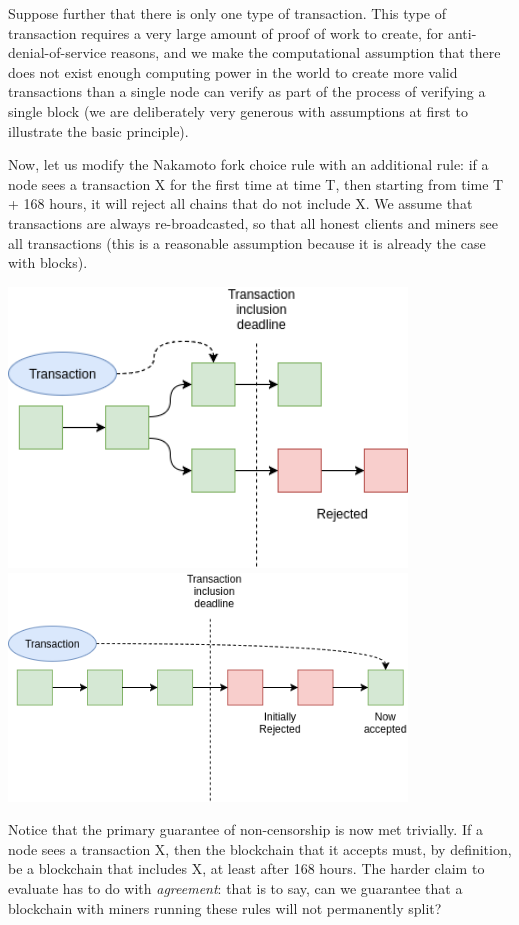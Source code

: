 \documentclass[12pt]{article}
\begin{document}
Suppose further that there is only one type of transaction. This type of transaction requires a very large amount of proof of work to create, for anti-denial-of-service reasons, and we make the computational assumption that there does not exist enough computing power in the world to create more valid transactions than a single node can verify as part of the process of verifying a single block (we are deliberately very generous with assumptions at first to illustrate the basic principle).

Now, let us modify the Nakamoto fork choice rule with an additional rule: if a node sees a transaction X for the first time at time T, then starting from time T + 168 hours, it will reject all chains that do not include X. We assume that transactions are always re-broadcasted, so that all honest clients and miners see all transactions (this is a reasonable assumption because it is already the case with blocks).

\includegraphics[width=400px]{Censorship3.png}
\includegraphics[width=400px]{Censorship3p5.png}

Notice that the primary guarantee of non-censorship is now met trivially. If a node sees a transaction X, then the blockchain that it accepts must, by definition, be a blockchain that includes X, at least after 168 hours. The harder claim to evaluate has to do with \textit{agreement}: that is to say, can we guarantee that a blockchain with miners running these rules will not permanently split?
\end{document}
